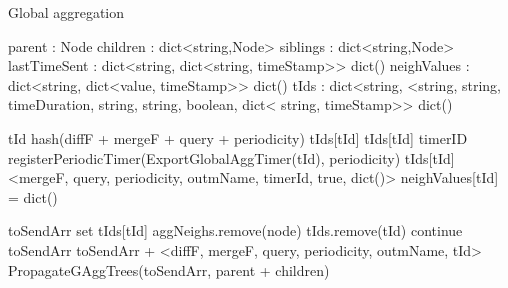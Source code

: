\begin{algorithm}
    \caption{Global aggregation} \label{alg:mon:global_agg}
    \begin{algorithmic}[1]

    \asdstate \label{alg:mon:global_agg:state_start}
        \State parent : Node  
        \State children : dict<string,Node>  
        \State siblings : dict<string,Node>   
        \State lastTimeSent : dict<string, dict<string, timeStamp>> \asdassign dict()
        \State neighValues : dict<string, dict<value, timeStamp>> \asdassign dict() \label{alg:mon:global_agg:state_end}
        \State tIds : dict<string, <string, string, timeDuration, string, string, boolean, dict< string, timeStamp>> \asdassign dict()
    \asdend

    \label{alg:mon:global_agg:start_req}
        \State tId \asdassign hash(diffF + mergeF + query + periodicity) 
            \State <diffF, mergeF, query, periodicity, outmName, timerId, isLocal, aggNeighs> \asdassign tIds[tId]
            \State tIds[tId] \asdassign <mergeF, query, periodicity, outmName, timerId, true, aggNeighs>
        \Else
            \State timerID \asdassign registerPeriodicTimer(ExportGlobalAggTimer(tId), periodicity)
            \State tIds[tId] \asdassign <mergeF, query, periodicity, outmName, timerId, true, dict()>
            \State neighValues[tId] = dict()
            \State
        \EndIf
    \asdend

     \label{alg:mon:global_agg:propag}
        \State toSendArr \asdassign set \label{alg:mon:global_agg:propag_start}
            \State <diffF, mergeF, query, periodicity, outmName, timerId, isLocal, aggNeighs> \asdassign tIds[tId]
                    \State aggNeighs.remove(node)
                \EndIf
            \EndFor
                \State tIds.remove(tId)
                \State continue
            \EndIf
                \State toSendArr \asdassign toSendArr + <diffF, mergeF, query, periodicity, outmName, tId>
            \EndIf
        \EndFor
        \State PropagateGAggTrees(toSendArr, parent + children) \label{alg:mon:global_agg:propag_end}
    \asdend


\end{algorithmic}
\end{algorithm}
